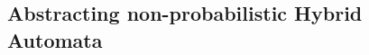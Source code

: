 \subsection{Abstracting non-probabilistic Hybrid Automata}
\label{sec:nonprobabs}



%



%


%


%


%




